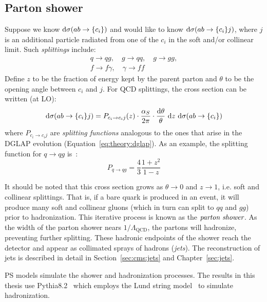 \subsection{Parton shower}
\label{sec:theory:ps}
Suppose we know ${\mathrm{d}\sigma(ab\rightarrow \{c_i\})}$ and would like to know ${\mathrm{d}\sigma(ab\rightarrow\{c_i\}j)}$, where ${j}$ is an additional particle radiated from one of the ${c_i}$ in the soft and/or collinear limit.
Such \emph{splittings} include:
\begin{gather}
    q\rightarrow qg, \quad g\rightarrow qq, \quad g\rightarrow gg, \nonumber \\ 
        f\rightarrow f\gamma, \quad \gamma\rightarrow ff 
\end{gather}
Define ${z}$ to be the fraction of energy kept by the parent parton and ${\theta}$ to be the opening angle between ${c_i}$ and ${j}$. 
For QCD splittings, the cross section can be written (at LO):
\begin{equation}
    \mathrm{d}\sigma(ab\rightarrow\{c_i\}j) =
        P_{c_i \rightarrow c_i j} (z) 
        \cdot \frac{\alpha_S}{2\pi} 
        \cdot \frac{\mathrm{d}\theta}{\theta} 
        ~\mathrm{d} z
        ~\mathrm{d}\sigma(ab\rightarrow\{c_i\})
\end{equation}
where ${P_{c_i\rightarrow c_i j}}$ are \emph{splitting functions} analogous to the ones that arise in the DGLAP evolution (Equation~\ref{eq:theory:dglap}).
As an example, the splitting function for ${q\rightarrow qg}$ is~\cite{pythia}:
\begin{equation}
    P_{q\rightarrow qg} = \frac{4}{3} \frac{1+z^2}{1-z}
\end{equation}

It should be noted that this cross section grows as ${\theta\rightarrow 0}$ and ${z\rightarrow 1}$, i.e. soft and collinear splittings.
That is, if a bare quark is produced in an event, it will produce many soft and collinear gluons (which in turn can split to ${qq}$ and ${gg}$) prior to hadronization.
This iterative process is known as the ${\emph{parton shower}}$.
As the width of the parton shower nears ${1/\Lambda_\mathrm{QCD}}$, the partons will hadronize, preventing further splitting.
These hadronic endpoints of the shower reach the detector and appear as collimated sprays of hadrons (\emph{jets}).
The reconstruction of jets is described in detail in Section~\ref{sec:cms:jets} and Chapter~\ref{sec:jets}. 

PS models simulate the shower and hadronization processes.
The results in this thesis use Pythia8.2~\cite{pythia} which employs the Lund string model~\cite{lund} to simulate hadronization.
